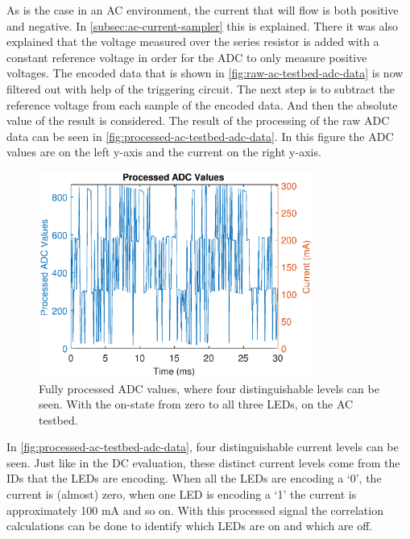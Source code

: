 As is the case in an AC environment, the current that will flow is both positive and negative.
In \autoref{subsec:ac-current-sampler} this is explained.
There it was also explained that the voltage measured over the series resistor is added with a constant reference voltage in order for the ADC to only measure positive voltages.
The encoded data that is shown in \autoref{fig:raw-ac-testbed-adc-data} is now filtered out with help of the triggering circuit.
The next step is to subtract the reference voltage from each sample of the encoded data.
And then the absolute value of the result is considered.
The result of the processing of the raw ADC data can be seen in \autoref{fig:processed-ac-testbed-adc-data}.
In this figure the ADC values are on the left y-axis and the current on the right y-axis.

\begin{figure}[ht]
  \centering
  \includegraphics[width=0.8\textwidth]{chapters/evaluation-chapters/hardware/ac/processed-ac-testbed-adc-data.eps}
    \caption{Fully processed ADC values, where four distinguishable levels can be seen. With the on-state from zero to all three LEDs, on the AC testbed.}
  \label{fig:processed-ac-testbed-adc-data}
\end{figure}

In \autoref{fig:processed-ac-testbed-adc-data}, four distinguishable current levels can be seen.
Just like in the DC evaluation, these distinct current levels come from the IDs that the LEDs are encoding.
When all the LEDs are encoding a `0', the current is (almost) zero, when one LED is encoding a `1' the current is approximately 100 mA and so on.
With this processed signal the correlation calculations can be done to identify which LEDs are on and which are off.


